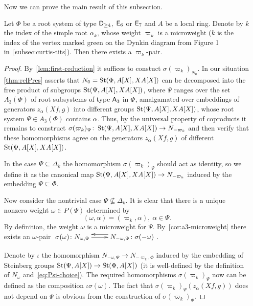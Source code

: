 Now we can prove the main result of this subsection.
\begin{thm} \label{thm:pairconstr}
    Let $\Phi$ be a root system of type $\mathsf{D}_{\geq 4}$, $\mathsf{E}_6$ or $\mathsf{E}_7$ and $A$ be a local ring.
    Denote by $k$ the index of the simple root $\alpha_k$, whose weight $\varpi_k$ is a microweight
     ($k$ is the index of the vertex marked green on the Dynkin diagram from Figure 1 in~\cref{subsec:curtis-tits}).
    Then there exists a $\varpi_k$-pair.
\end{thm}
\begin{proof}
    By~\cref{lem:first-reduction} it suffices to constuct $\sigma({\varpi_k})_{N_0}$.
    In our situation \cref{thm:relPres} asserts that $N_0 = \operatorname{St}(\Phi, A[X], XA[X])$ can be decomposed into the free product of subgroups $\operatorname{St}(\Psi, A[X], XA[X])$,
    where $\Psi$ ranges over the set $A_3(\Phi)$ of root subsystems of type $\mathsf{A}_3$ in $\Phi$, amalgamated over embeddings of generators $z_\alpha(Xf, g)$ into different groups $\operatorname{St}(\Psi, A[X], XA[X])$, whose root system $\Psi \in A_3(\Phi)$ contains $\alpha$.
    Thus, by the universal property of coproducts it remains to construct $\sigma(\varpi_k)_\Psi \colon \operatorname{St}(\Psi, A[X], XA[X]) \to N_{-\varpi_k}$ and then
    verify that these homomorphisms agree on the generators $z_\alpha(Xf, g)$ of different $\operatorname{St}(\Psi, A[X], XA[X])$.

    In the case $\Psi \subseteq \Delta_k$ the homomorphism $\sigma(\varpi_k)_\Psi$ should act as identity, so we define it as the canonical map $\operatorname{St}(\Psi, A[X], XA[X]) \to N_{-\varpi_k}$
    induced by the embedding $\Psi \subseteq \Phi$.

    Now consider the nontrivial case $\Psi \not\subseteq \Delta_k$.
    It is clear that there is a unique nonzero weight $\omega \in P(\Psi)$ determined by
    \begin{equation} \label{eq:Psi-choice} (\omega, \alpha) = (\varpi_k, \alpha),\ \alpha \in \Psi. \end{equation}
    By definition, the weight $\omega$ is a microweight for $\Psi$.
    By~\cref{cor:a3-microweight} there exists an $\omega$-pair $\xymatrix{ \sigma(\omega)\colon N_{\omega, \Psi} \ar[r] & \ar@<-1.0ex>[l] N_{-\omega, \Psi}\colon \sigma(-\omega) }$.

    Denote by $\iota$ the homomorphism $N_{-\omega, \Psi} \to N_{-\varpi_k, \Phi}$ induced by the embedding of Steinberg groups $\operatorname{St}(\Psi, A[X]) \to \operatorname{St}(\Phi, A[X])$ (it is well-defined by the definition of $N_\omega$ and~\eqref{eq:Psi-choice}).
    The required homomorphisms $\sigma(\varpi_k)_\Psi$ now can be defined as the composition $\iota \sigma(\omega)$.
    The fact that $\sigma(\varpi_k)_\Psi(z_\alpha(Xf, g))$ does not depend on $\Psi$ is obvious from the construction of $\sigma(\varpi_k)_\Psi$.
\end{proof}